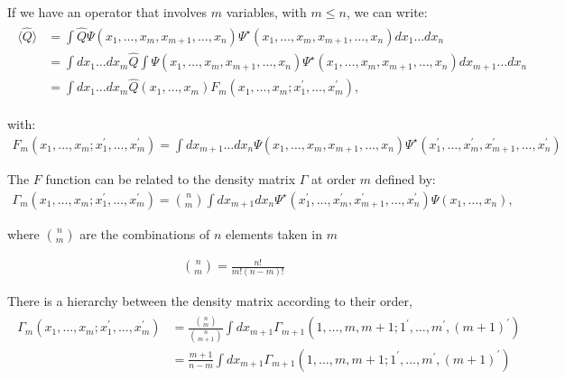 If we have an operator that involves $m$ variables, with $m\le n$, we can write:
%
\small
\begin{align}
	\begin{split}
\langle \widehat{Q} \rangle & = \int\widehat{Q}\Psi(x_{1},\ldots , x_{m}, x_{m+1}, \ldots , x_{n})
\Psi^{\star}(x_{1},\ldots , x_{m}, x_{m+1}, \ldots , x_{n}) dx_{1}\ldots dx_{n} \\
	& =\int dx_{1}\ldots dx_{m} \widehat{Q}\int\Psi(x_{1},\ldots , x_{m}, x_{m+1}, \ldots , x_{n})
	\Psi^{\star}(x_{1},\ldots , x_{m}, x_{m+1}, \ldots , x_{n}) dx_{m+1}\ldots dx_{n}\\
	& =\int dx_{1}\ldots dx_{m} \widehat{Q} (x_{1}, \ldots , x_{m}) F_{m}
	(x_{1}, \ldots , x_{m}; x^{\prime}_{1}, \ldots , x^{\prime}_{m}),
	\end{split}
\end{align}
\normalsize

\noindent with:
%
\footnotesize
\begin{align}
F_{m}(x_{1}, \ldots , x_{m}; x^{\prime}_{1}, \ldots , x^{\prime}_{m}) =
\int dx_{m+1}\ldots dx_{n} \Psi(x_{1},\ldots , x_{m}, x_{m+1}, \ldots , x_{n})
\Psi^{\star}(x^{\prime}_{1},\ldots , x^{\prime}_{m}, x^{\prime}_{m+1}, \ldots , x^{\prime}_{n})
\end{align}
\normalsize

The $F$ function can be related to the density matrix
$\Gamma$ at order $m$ defined by:
%
\footnotesize
\begin{align}
\Gamma_{m}(x_{1}, \ldots , x_{m}; x^{\prime}_{1}, \ldots , x^{\prime}_{m}) = {n \choose m}\int dx_{m+1}
dx_{n} \Psi^{\star}(x^{\prime}_{1},\ldots , x^{\prime}_{m}, x^{\prime}_{m+1}, \ldots , x^{\prime}_{n}) \Psi(x_{1},\ldots ,x_{n}),
\end{align}
\normalsize

\noindent where ${n \choose m}$ are the combinations of $n$ elements taken in $m$
 
%
\small
\begin{align}
{n \choose m} = \frac{n!}{m! (n-m)!}\, 
\end{align}
\normalsize

There is a hierarchy between the density matrix 
according to their order,
\small
\begin{align}
\begin{split}
\Gamma_{m}(x_{1}, \ldots , x_{m}; x^{\prime}_{1}, \ldots , x^{\prime}_{m}) & = \frac{{n \choose m}}{{n \choose {m+1}}}
\int dx_{m+1}\Gamma_{m+1}(1, \ldots , m, m+1;1^{\prime}, \ldots , m^{\prime}, (m+1)^{\prime}) \\
	& = \frac{m+1}{n-m} \int dx_{m+1}\Gamma_{m+1}(1, \ldots , m, m+1;1^{\prime}, \ldots , m^{\prime}, (m+1)^{\prime})
\end{split}
\end{align}
\normalsize

